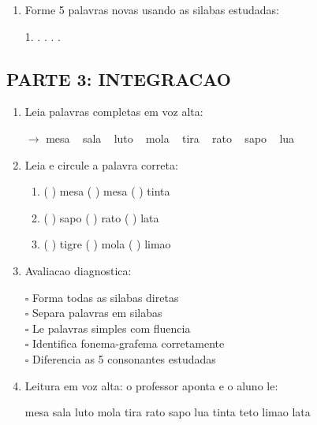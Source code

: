 \begin{exercicio}
\begin{enumerate}[resume]
  \item Forme 5 palavras novas usando as silabas estudadas:
  \begin{center}
  1. \underline{\hspace{3cm}} . \underline{\hspace{3cm}} . \underline{\hspace{3cm}} . \underline{\hspace{3cm}} . \underline{\hspace{3cm}}
  \end{center}
\end{enumerate}

\subsection*{PARTE 3: INTEGRACAO}

\begin{enumerate}[resume]
  \item Leia palavras completas em voz alta:
  \begin{center}
  $\rightarrow$ mesa  ~  sala  ~  luto  ~  mola  ~  tira  ~  rato  ~  sapo  ~  lua
  \end{center}

  \item Leia e circule a palavra correta:
  \begin{enumerate}[label=(\alph*)]
    \item ( ) mesa \quad ( ) mesa \quad ( ) tinta
    \item ( ) sapo \quad ( ) rato \quad ( ) lata
    \item ( ) tigre \quad ( ) mola \quad ( ) limao
  \end{enumerate}

  \item Avaliacao diagnostica:
  \begin{center}
  $\square$ Forma todas as silabas diretas\\
  $\square$ Separa palavras em silabas\\
  $\square$ Le palavras simples com fluencia\\
  $\square$ Identifica fonema-grafema corretamente\\
  $\square$ Diferencia as 5 consonantes estudadas
  \end{center}

  \item Leitura em voz alta: o professor aponta e o aluno le:
  \begin{center}
  mesa \quad sala \quad luto \quad mola \quad tira \quad rato \quad sapo \quad lua \quad tinta \quad teto \quad limao \quad lata
  \end{center}


\end{enumerate}
\end{exercicio}
